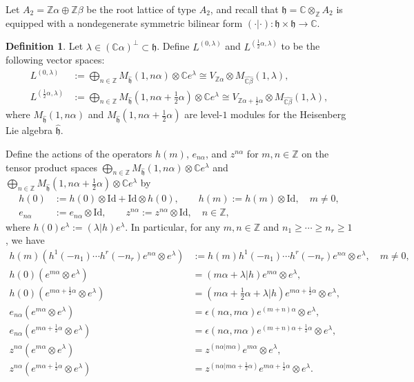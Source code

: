 \documentclass[12pt,a4paper,reqno]{amsart}
\numberwithin{equation}{section}
\numberwithin{equation}{section}
\theoremstyle{definition}
\newtheorem{df}[thm]{Definition}
\newcommand{\Z}{\mathbb{Z}}
\def \C {\mathbb{C}}
\def\la{\lambda}
\def \al{\alpha}
\def \b {\beta}
\def \op {\oplus}
\def \h {\mathfrak{h}}
\def\Id{\mathrm{Id}}
\begin{document}
	Let $A_2=\Z\al\op \Z\b$ be the root lattice of type $A_2$, and recall that $\h=\C\otimes_\Z A_2$ is equipped with a nondegenerate symmetric bilinear form $(\cdot|\cdot):\h\times \h\to \C$.  
	
	\begin{df} \label{df5.3}
		Let $\la\in (\C\al)^\perp\subset \h$. Define $L^{(0,\la)}$ and $L^{(\frac{1}{2}\al,\la)}$ to be the following vector spaces: 
		\begin{align}
			L^{(0,\la)}&:=\bigoplus_{n\in \Z} M_{\hat{\h}}(1,n\al)\otimes \C e^\la
			\cong V_{\Z\al}\otimes M_{\widehat{\C\b}}(1,\la), \label{5.4}\\
			L^{(\frac{1}{2}\al,\la)}&:=\bigoplus_{n\in \Z} M_{\hat{\h}}(1,n\al+\tfrac{1}{2}\al)\otimes \C e^\la
			\cong  V_{\Z\al+\frac{1}{2}\al}\otimes  M_{\widehat{\C\b}}(1,\la),\label{5.5}
		\end{align}
		where $M_{\hat{\h}}(1,n\al)$ and $M_{\hat{\h}}(1,n\al+\frac{1}{2}\al)$ are level-$1$ modules for the Heisenberg Lie algebra $\hat{\h}$.
		
		Define the actions of the operators $h(m)$, $e_{n\al}$, and $z^{n\al}$ for $m,n\in \Z$ on the tensor product spaces $\bigoplus_{n\in \Z} M_{\hat{\h}}(1,n\al)\otimes \C e^\la$ and $\bigoplus_{n\in \Z} M_{\hat{\h}}(1,n\al+\frac{1}{2}\al)\otimes \C e^\la$ by
		\begin{align}
			h(0)&:=h(0)\otimes \Id+\Id \otimes h(0),\qquad 
			h(m):=h(m)\otimes \Id,\quad m\neq 0, \label{5.6}\\
			e_{n\al}&:=e_{n\al}\otimes \Id,\qquad 
			z^{n\al}:=z^{n\al}\otimes \Id,\quad n\in \Z, \label{5.7}
		\end{align}
		where $h(0)e^\la:=(\la|h)e^\la$. In particular, for any $m,n\in \Z$ and $n_1\geq \cdots \geq n_r\geq 1$, we have 
		\begin{align}
			h(m)(h^1(-n_1)\cdots h^r(-n_r)e^{n\al}\otimes e^\la)
			&:=h(m)h^1(-n_1)\cdots h^r(-n_r)e^{n\al}\otimes e^\la,\quad m\neq 0,\label{5.8}\\
			h(0)(e^{m\al}\otimes e^\la)
			&=(m\al+\la|h)e^{m\al}\otimes e^\la,\label{5.9a}\\
			h(0)(e^{m\al+\frac{1}{2}\al}\otimes e^\la)
			&=(m\al+\tfrac{1}{2}\al+\la|h)e^{m\al+\frac{1}{2}\al}\otimes e^\la,\label{5.9}\\
			e_{n\al}(e^{m\al}\otimes e^\la)
			&=\epsilon(n\al,m\al)e^{(m+n)\al}\otimes e^\la,\label{5.10a}\\
			e_{n\al}(e^{m\al+\frac{1}{2}\al}\otimes e^\la)
			&=\epsilon(n\al,m\al)e^{(m+n)\al+\frac{1}{2}\al}\otimes e^\la,\label{5.10}\\
			z^{n\al}(e^{m\al}\otimes e^\la)
			&=z^{(n\al|m\al)}e^{m\al}\otimes e^\la,\label{5.11a}\\
			z^{n\al}(e^{m\al+\frac{1}{2}\al}\otimes e^\la)
			&=z^{(n\al|m\al+\frac{1}{2}\al)}e^{m\al+\frac{1}{2}\al}\otimes e^\la. \label{5.11}
		\end{align}
		

\end{df}
\end{document}
